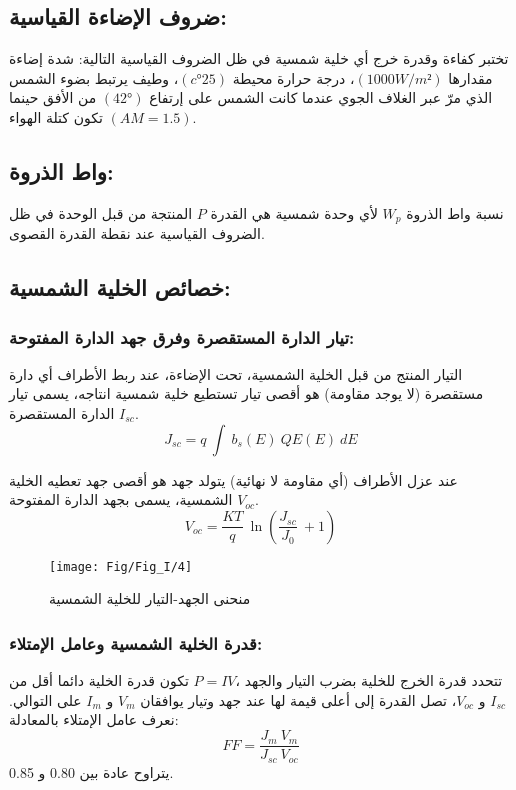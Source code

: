 \subsection{ضروف الإضاءة القياسية:}
تختبر كفاءة وقدرة خرج أي خلية شمسية في ظل الضروف القياسية التالية: شدة إضاءة مقدارها $ (1000W/m²) $، درجة حرارة محيطة $ (c°25) $، وطيف يرتبط بضوء الشمس الذي مرّ عبر الغلاف الجوي عندما كانت الشمس على إرتفاع $  (42°)  $ من الأفق حينما تكون كتلة الهواء $ (AM=1.5) $.
\subsection{واط الذروة:}
نسبة واط الذروة $ W_p $ لأي وحدة شمسية هي القدرة $ P $ المنتجة من قبل الوحدة في ظل الضروف القياسية عند نقطة القدرة القصوى.
\subsection{خصائص الخلية الشمسية:}
\subsubsection{تيار الدارة المستقصرة وفرق جهد الدارة المفتوحة:}
التيار المنتج من قبل الخلية الشمسية، تحت الإضاءة، عند ربط الأطراف أي دارة مستقصرة (لا يوجد مقاومة) ‫هو‬ ‫أقصى‬ ‫تيار‬ ‫تستطيع‬ ‫خلية‬ ‫شمسية‬ ‫انتاجه‬، يسمى تيار الدارة المستقصرة $ I_{sc} $.
\begin{equation}
	J_{sc}=q\  \int\ b_s  \left( E \right)\ QE \left( E \right)\ dE
	\label{معادلة 1}
\end{equation}

عند عزل الأطراف (أي مقاومة لا نهائية) يتولد جهد هو أقصى جهد تعطيه الخلية الشمسية، يسمى بجهد الدارة المفتوحة $ V_{oc} $.
\begin{equation}
	V_{oc}= \frac{KT}{q}\ \ln \left( \frac{J_{sc}}{J_0}\ +1 \right)
\end{equation}

\begin{figure}[h!]
	\centering
	\texttt{[image: Fig/Fig\_I/4]}
	\caption{منحنى الجهد-التيار للخلية الشمسية}
	\label{fig:4}
\end{figure}
\FloatBarrier
\subsubsection{قدرة الخلية الشمسية وعامل الإمتلاء:} 
تتحدد قدرة الخرج للخلية بضرب التيار والجهد $ P=IV، $ تكون قدرة الخلية دائما أقل من $ I_{sc} $ و $ V_{oc} $، تصل القدرة إلى أعلى قيمة لها عند جهد وتيار يوافقان $ V_m $ و $ I_m $ على التوالي.
نعرف عامل الإمتلاء بالمعادلة:
\begin{equation}
	FF=\frac{J_m\ V_m}{J_{sc}\ V_{oc}}
\end{equation}
يتراوح عادة بين 0.80 و 0.85.
